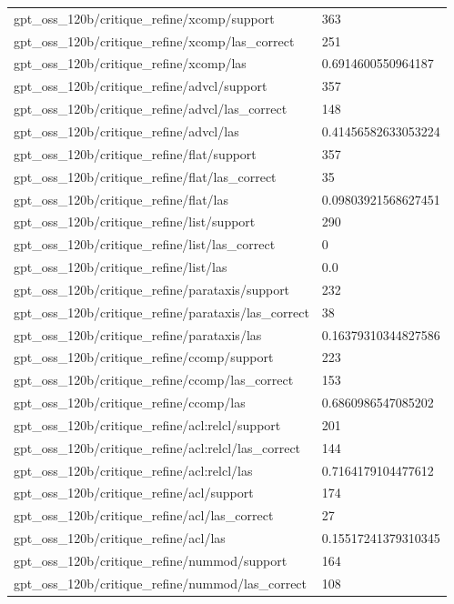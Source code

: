 \begin{tabular}{ll}
gpt\_oss\_120b/critique\_refine/xcomp/support & 363 \\
gpt\_oss\_120b/critique\_refine/xcomp/las\_correct & 251 \\
gpt\_oss\_120b/critique\_refine/xcomp/las & 0.6914600550964187 \\
gpt\_oss\_120b/critique\_refine/advcl/support & 357 \\
gpt\_oss\_120b/critique\_refine/advcl/las\_correct & 148 \\
gpt\_oss\_120b/critique\_refine/advcl/las & 0.41456582633053224 \\
gpt\_oss\_120b/critique\_refine/flat/support & 357 \\
gpt\_oss\_120b/critique\_refine/flat/las\_correct & 35 \\
gpt\_oss\_120b/critique\_refine/flat/las & 0.09803921568627451 \\
gpt\_oss\_120b/critique\_refine/list/support & 290 \\
gpt\_oss\_120b/critique\_refine/list/las\_correct & 0 \\
gpt\_oss\_120b/critique\_refine/list/las & 0.0 \\
gpt\_oss\_120b/critique\_refine/parataxis/support & 232 \\
gpt\_oss\_120b/critique\_refine/parataxis/las\_correct & 38 \\
gpt\_oss\_120b/critique\_refine/parataxis/las & 0.16379310344827586 \\
gpt\_oss\_120b/critique\_refine/ccomp/support & 223 \\
gpt\_oss\_120b/critique\_refine/ccomp/las\_correct & 153 \\
gpt\_oss\_120b/critique\_refine/ccomp/las & 0.6860986547085202 \\
gpt\_oss\_120b/critique\_refine/acl:relcl/support & 201 \\
gpt\_oss\_120b/critique\_refine/acl:relcl/las\_correct & 144 \\
gpt\_oss\_120b/critique\_refine/acl:relcl/las & 0.7164179104477612 \\
gpt\_oss\_120b/critique\_refine/acl/support & 174 \\
gpt\_oss\_120b/critique\_refine/acl/las\_correct & 27 \\
gpt\_oss\_120b/critique\_refine/acl/las & 0.15517241379310345 \\
gpt\_oss\_120b/critique\_refine/nummod/support & 164 \\
gpt\_oss\_120b/critique\_refine/nummod/las\_correct & 108 \\

\end{tabular}
